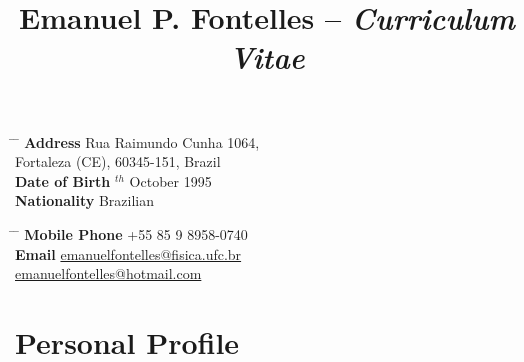 \documentclass[10pt]{article} %
\begin{document}

\title{Emanuel P. Fontelles -- {\it Curriculum Vitae}} %


\parbox{0.5\textwidth}{ %
\begin{tabbing} %
\hspace{3cm} \= \hspace{4cm} \= \kill %
{\bf Address} \> Rua Raimundo Cunha 1064,\\ %
\> Fortaleza (CE), 60345-151, Brazil \\ %
{\bf Date of Birth} $^{th}$ October 1995 \\ %
{\bf Nationality} \> Brazilian %
\end{tabbing}}
\hfill %
\parbox{0.5\textwidth}{ %
\begin{tabbing} %
\hspace{3cm} \= \hspace{4cm} \= \kill %
{\bf Mobile Phone} \> +55 85 9 8958-0740 \\ %
{\bf Email} \> \href{mailto:emanuelfontelles@fisica.ufc.br}{emanuelfontelles@fisica.ufc.br} \\ %
            \> \href{mailto:emanuelfontelles@hotmail.com}{emanuelfontelles@hotmail.com} \\ %
\end{tabbing}}


\section{Personal Profile}

\end{document}
